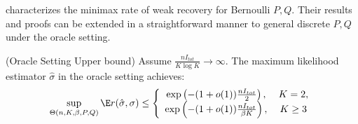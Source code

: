 \documentclass{article}
\begin{document}
\cite{zhangminimax} characterizes the minimax rate of weak recovery for Bernoulli $P,Q$. Their results and proofs can be extended in a straightforward manner to general discrete $P,Q$ under the oracle setting. 

\begin{proposition} 
\label{prop:weak_recovery_oracle}
(Oracle Setting Upper bound)
Assume $\frac{n I_{tot}}{K \log K} \rightarrow \infty$. The maximum likelihood estimator $\hat{\sigma}$ in the oracle setting achieves:
\[
\sup_{\Theta(n, K, \beta, P, Q)} \E r(\hat{\sigma}, \sigma) \leq \left\{ 
    \begin{array}{cc} 
   \exp \left( - (1 + o(1)) \frac{nI_{tot}}{2} \right ), \, & K=2, \\
   \exp \left( - (1 + o(1)) \frac{nI_{tot}}{\beta K} \right ), \,& K\geq 3
  \end{array} \right. 
\]

\end{proposition}
\end{document}
